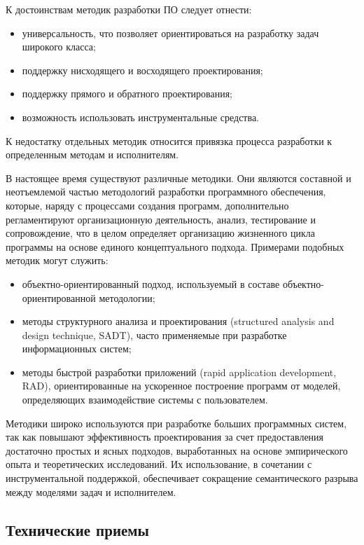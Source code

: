 К достоинствам методик разработки ПО следует отнести:

\begin{itemize}
    \item универсальность, что позволяет ориентироваться на разработку задач широкого класса;
    \item поддержку нисходящего и восходящего проектирования;
    \item поддержку прямого и обратного проектирования;
    \item возможность использовать инструментальные средства.
\end{itemize}
К недостатку отдельных методик относится привязка процесса разработки к определенным методам и исполнителям.

В настоящее время существуют различные методики. Они являются составной и неотъемлемой частью методологий разработки программного обеспечения, которые, наряду с процессами создания программ, дополнительно регламентируют организационную деятельность, анализ, тестирование и сопровождение, что в целом определяет организацию жизненного цикла программы на основе единого концептуального подхода. Примерами подобных методик могут служить:

\begin{itemize}
    \item объектно-ориентированный подход, используемый в составе объектно-ориентированной методологии;
    \item методы структурного анализа и проектирования (structured analysis and design technique, SADT), часто применяемые при разработке информационных систем;
    \item методы быстрой разработки приложений (rapid application development, RAD), ориентированные на ускоренное построение программ от моделей, определяющих взаимодействие системы с пользователем.
\end{itemize}

Методики широко используются при разработке больших программных систем, так как повышают эффективность проектирования за счет предоставления достаточно простых и ясных подходов, выработанных на основе эмпирического опыта и теоретических исследований. Их использование, в сочетании с инструментальной поддержкой, обеспечивает сокращение семантического разрыва между моделями задач и исполнителем.

\subsection{Технические приемы}

